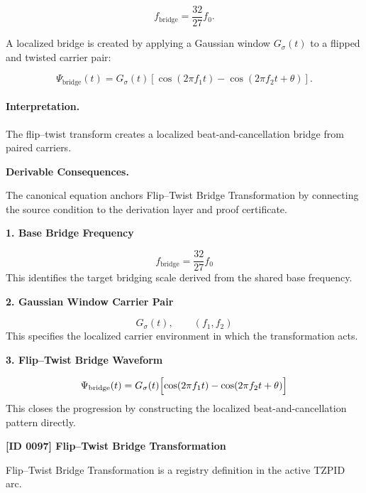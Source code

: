 \begin{equation}
f_{\mathrm{bridge}}=\frac{32}{27}f_0.
\end{equation}

A localized bridge is created by applying a Gaussian window $G_\sigma(t)$ to a flipped and twisted carrier pair:

\begin{equation}
\boxed{
\Psi_{\mathrm{bridge}}(t)
=
G_{\sigma}(t)
\left[
\cos(2\pi f_1t)
-
\cos(2\pi f_2t+\theta)
\right].
}
\end{equation}

\paragraph{Interpretation.}
The flip--twist transform creates a localized beat-and-cancellation bridge from paired carriers.

\par\vspace{0.35em}
\noindent\textbf{Derivable Consequences.}\quad
\begingroup
\footnotesize
\raggedright
The canonical equation anchors Flip--Twist Bridge Transformation by connecting the source condition to the derivation layer and proof certificate.
\par\endgroup

\noindent\textbf{1. Base Bridge Frequency}\par
\[
f_{\mathrm{bridge}} = \frac{32}{27} f_0
\]
\noindent This identifies the target bridging scale derived from the shared base frequency.\par
\noindent\textbf{2. Gaussian Window Carrier Pair}\par
\[
G_{\sigma}(t),\qquad (f_1,f_2)
\]
\noindent This specifies the localized carrier environment in which the transformation acts.\par
\noindent\textbf{3. Flip--Twist Bridge Waveform}\par
\[
\Psi_{\mathrm{bridge}}(t)
=
G_{\sigma}(t)
\Bigl[
\cos(2\pi f_1 t) - \cos(2\pi f_2 t + \theta)
\Bigr]
\]
\noindent This closes the progression by constructing the localized beat-and-cancellation pattern directly.\par

\clearpage
\noindent\textbf{[ID 0097] Flip--Twist Bridge Transformation}\par
\vspace{0.35em}
\begingroup\small
{}
Flip--Twist Bridge Transformation is a registry definition in the active TZPID arc.

